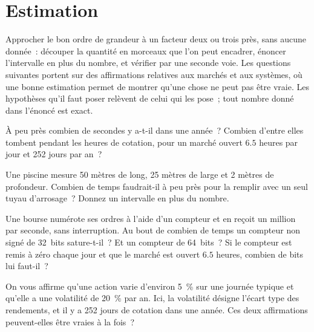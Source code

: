 \chapter{Estimation}\label{ch:iv1:estimation}

\begin{ivtrains}
Approcher le bon ordre de grandeur à un facteur deux ou trois près, sans aucune donnée~: découper la quantité en morceaux que l'on peut encadrer, énoncer
l'intervalle en plus du nombre, et vérifier par une seconde voie. Les questions suivantes portent sur des affirmations relatives aux marchés et aux systèmes, où une bonne estimation permet de montrer qu'une chose ne peut pas être vraie.
Les hypothèses qu'il faut poser relèvent de celui qui les pose~; tout nombre donné dans l'énoncé est exact.
\end{ivtrains}

\begin{question}\label{iq:iv1:estimation:1}
À peu près combien de secondes y a-t-il dans une année~? Combien d'entre elles tombent pendant les heures de cotation, pour un marché ouvert $6.5$ heures par jour et 252 jours par an~?
\end{question}

\begin{question}\label{iq:iv1:estimation:2}
Une piscine mesure 50 mètres de long, 25 mètres de large et 2 mètres de profondeur. Combien de temps faudrait-il à peu près pour la remplir avec un seul tuyau d'arrosage~? Donnez un intervalle en plus du nombre.
\end{question}

\begin{question}\label{iq:iv1:estimation:3}
Une bourse numérote ses ordres à l'aide d'un compteur et en reçoit un million par seconde, sans interruption. Au bout de combien de temps un compteur non signé de 32~bits sature-t-il~? Et un compteur de 64~bits~? Si le compteur est remis à zéro chaque jour et que le marché est ouvert $6.5$ heures, combien de bits lui faut-il~?
\end{question}

\begin{question}\label{iq:iv1:estimation:4}
On vous affirme qu'une action varie d'environ 5~\% sur une journée typique et qu'elle a une volatilité de 20~\% par an. Ici, la volatilité désigne l'écart type des rendements, et il y a 252 jours de cotation dans une année. Ces deux affirmations peuvent-elles être vraies à la fois~?
\end{question}

